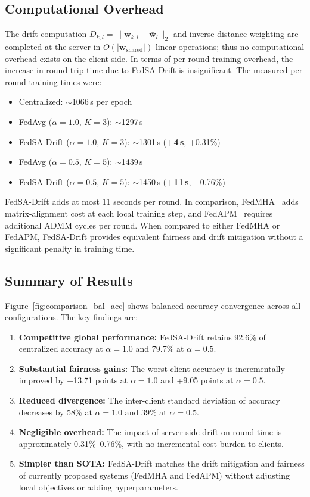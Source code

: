 \documentclass{ieeeaccess}
\newcommand{\sadrift}{FedSA-Drift}
\begin{document}
\subsection{Computational Overhead}
\label{sec:computational_overhead}

The drift computation $D_{k,l} = \|\mathbf{w}_{k,l} - \bar{\mathbf{w}}_l\|_2$ and inverse-distance weighting are completed at the server in $O(|\mathbf{w}_{\text{shared}}|)$ linear operations; thus no computational overhead exists on the client side. In terms of per-round training overhead, the increase in round-trip time due to \sadrift{} is insignificant. The measured per-round training times were:

\begin{itemize}
    \item Centralized: $\sim$1066\,s per epoch
    \item FedAvg ($\alpha{=}1.0$, $K{=}3$): $\sim$1297\,s
    \item \sadrift{} ($\alpha{=}1.0$, $K{=}3$): $\sim$1301\,s (\textbf{+4\,s}, +0.31\%)
    \item FedAvg ($\alpha{=}0.5$, $K{=}5$): $\sim$1439\,s
    \item \sadrift{} ($\alpha{=}0.5$, $K{=}5$): $\sim$1450\,s (\textbf{+11\,s}, +0.76\%)
\end{itemize}

\sadrift{} adds at most 11 seconds per round. In comparison, FedMHA~\cite{Darzi2024} adds matrix-alignment cost at each local training step, and FedAPM~\cite{Zhu2025} requires additional ADMM cycles per round. When compared to either FedMHA or FedAPM, \sadrift{} provides equivalent fairness and drift mitigation without a significant penalty in training time.

\subsection{Summary of Results}

Figure~\ref{fig:comparison_bal_acc} shows balanced accuracy convergence across all configurations. The key findings are:

\begin{enumerate}
    \item \textbf{Competitive global performance:} \sadrift{} retains 92.6\% of centralized accuracy at $\alpha{=}1.0$ and 79.7\% at $\alpha{=}0.5$.
    \item \textbf{Substantial fairness gains:} The worst-client accuracy is incrementally improved by +13.71 points at $\alpha{=}1.0$ and +9.05 points at $\alpha{=}0.5$.
    \item \textbf{Reduced divergence:} The inter-client standard deviation of accuracy decreases by 58\% at $\alpha{=}1.0$ and 39\% at $\alpha{=}0.5$.
    \item \textbf{Negligible overhead:} The impact of server-side drift on round time is approximately 0.31\%--0.76\%, with no incremental cost burden to clients.
    \item \textbf{Simpler than SOTA:} \sadrift{} matches the drift mitigation and fairness of currently proposed systems (FedMHA and FedAPM) without adjusting local objectives or adding hyperparameters.
\end{enumerate}
\end{document}

